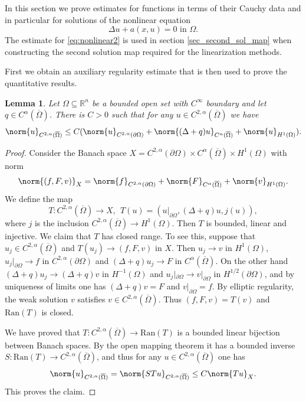 \documentclass[11pt,a4paper]{amsart}
\newtheorem{Lemma}[Theorem]{Lemma}
\theoremstyle{definition}
\numberwithin{equation}{section}
\newcommand{\mR}{\mathbb{R}}                    %
\newcommand{\ol}[1]{\overline{#1}}
\newcommand{\p}{\partial}
\newcommand{\Om}{\Omega}
\begin{document}
In this section we prove estimates for functions in terms of their Cauchy data and in particular for solutions of the nonlinear equation
\begin{equation} \label{eq:nonlinear2}
	\Delta u + a(x, u) = 0 \text{ in }\Omega.
\end{equation}
The estimate for \eqref{eq:nonlinear2} is used in section \ref{sec_second_sol_map} when constructing the second solution map required for the linearization methods. 

First we obtain an auxiliary regularity estimate that is then used to prove the quantitative results.

\begin{Lemma} \label{lemma_cauchy_quant.}
Let $\Omega\subseteq\mR^{n}$ be a bounded open set with $C^{\infty}$ boundary and let $q \in C^{\alpha}(\ol{\Om})$. There is $C > 0$ such that for any $u \in C^{2,\alpha}(\ol{\Om})$ we have 
\[
    \norm{u}_{C^{2,\alpha}(\ol{\Om})} \leq C (\norm{u}_{C^{2,\alpha}(\p \Om)} + \norm{(\Delta+q)u}_{C^{\alpha}(\ol{\Om})} + \norm{u}_{H^1(\Om)}).
\]
\end{Lemma}
\begin{proof}
Consider the Banach space $X = C^{2,\alpha}(\p \Om) \times C^{\alpha}(\ol{\Om}) \times H^1(\Om)$ with norm 
\[
\norm{(f,F,v)}_X = \norm{f}_{C^{2,\alpha}(\p \Om)} + \norm{F}_{C^{\alpha}(\ol{\Om})} + \norm{v}_{H^1(\Om)}.
\]
We define the map 
\[
T: C^{2,\alpha}(\ol{\Om}) \to X, \ \ T(u) = (u|_{\p \Om}, (\Delta+q)u, j(u)),
\]
where $j$ is the inclusion $C^{2,\alpha}(\ol{\Om}) \to H^1(\Om)$. Then $T$ is bounded, linear and injective. We claim that $T$ has closed range. To see this, suppose that $u_j \in C^{2,\alpha}(\ol{\Om})$ and $T(u_j) \to (f, F, v)$ in $X$. Then $u_j \to v$ in $H^1(\Om)$, $u_j|_{\p \Om} \to f$ in $C^{2,\alpha}(\p \Om)$ and $(\Delta+q)u_j \to F$ in $C^{\alpha}(\ol{\Om})$. On the other hand $(\Delta+q)u_j \to (\Delta+q)v$ in $H^{-1}(\Om)$ and $u_j|_{\p \Om} \to v|_{\p \Om}$ in $H^{1/2}(\p \Om)$, and by uniqueness of limits one has $(\Delta+q)v = F$ and $v|_{\p \Om} = f$. By elliptic regularity, the weak solution $v$ satisfies $v \in C^{2,\alpha}(\ol{\Om})$. Thus $(f,F,v) = T(v)$ and $\mathrm{Ran}(T)$ is closed.

We have proved that $T: C^{2,\alpha}(\ol{\Om}) \to \mathrm{Ran}(T)$ is a bounded linear bijection between Banach spaces. By the open mapping theorem it has a bounded inverse $S: \mathrm{Ran}(T) \to C^{2,\alpha}(\ol{\Om})$, and thus for any $u \in C^{2,\alpha}(\ol{\Om})$ one has 
\[
\norm{u}_{C^{2,\alpha}(\ol{\Om})} = \norm{STu}_{C^{2,\alpha}(\ol{\Om})} \leq C \norm{Tu}_{X}.
\]
This proves the claim.
\end{proof}
\end{document}
